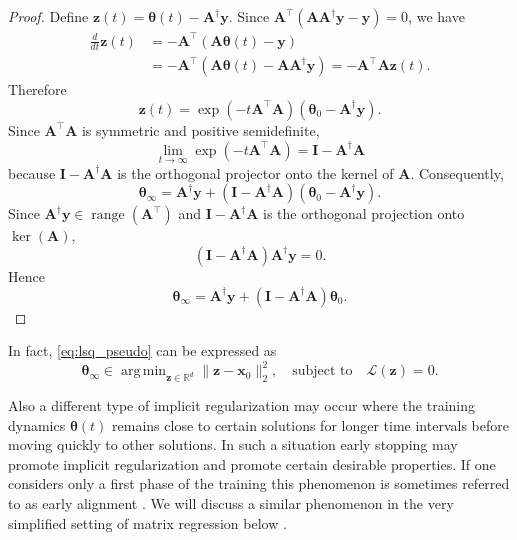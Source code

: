 \documentclass{svproc}
\newcommand{\bA}{\boldsymbol{A}}
\newcommand{\bI}{\boldsymbol{I}}
\newcommand{\bx}{\boldsymbol{x}}
\newcommand{\by}{\boldsymbol{y}}
\newcommand{\bz}{\boldsymbol{z}}
\newcommand{\btheta}{{\boldsymbol{\theta}}}
\newcommand{\0}{\boldsymbol{0}}
\newcommand{\1}{\boldsymbol{1}}
\DeclareMathOperator*{\argmin}{arg\,min}
\begin{document}
\begin{proof}
Define $\bz(t)=\btheta(t)-\bA^\dagger\by$. Since $\bA^\top(\bA\bA^\dagger\by-\by)=0$, we have
\begin{align*}
    \frac{d}{dt}{\bz}(t)
    &=-\bA^\top(\bA\btheta(t)-\by)\\
    &=-\bA^\top(\bA\btheta(t)-\bA\bA^\dagger\by)
    =-\bA^\top\bA\bz(t).
\end{align*}
Therefore
\begin{equation*}
    \bz(t)=\exp(-t\bA^\top\bA)(\btheta_0-\bA^\dagger\by).
\end{equation*}
Since $\bA^\top\bA$ is symmetric and positive semidefinite,
\begin{equation*}
    \lim_{t\to\infty}\exp(-t\bA^\top\bA)=\bI-\bA^\dagger\bA
\end{equation*}
because $\bI-\bA^\dagger\bA$ is the orthogonal projector onto the kernel of $\bA$. Consequently,
\begin{equation*}
    \btheta_\infty=\bA^\dagger\by+(\bI-\bA^\dagger\bA)(\btheta_0-\bA^\dagger\by).
\end{equation*}
Since $\bA^\dagger\by\in\operatorname{range}(\bA^\top)$ and $\bI-\bA^\dagger\bA$ is the orthogonal projection onto $\ker(\bA)$,
\begin{equation*}
    (\bI-\bA^\dagger\bA)\bA^\dagger\by=0.
\end{equation*}
Hence
\begin{equation*}
    \btheta_\infty=\bA^\dagger\by+(\bI-\bA^\dagger\bA)\btheta_0. \tag*{\qed}
\end{equation*}
\end{proof}
In fact, \eqref{eq:lsq_pseudo} can be expressed as
\begin{equation}\label{eq:implicit_bias_onelayer}
    \btheta_\infty \in \argmin_{\bz\in\mathbb{R}^d}\|\bz-\bx_0\|_2^2,\quad
    \text{subject to}\quad \mathcal{L}(\bz)= 0.
\end{equation}

\medskip

Also a different type of implicit regularization may occur where the training dynamics $\btheta(t)$ remains close to certain solutions for longer time intervals before moving quickly to other solutions. In such a situation early stopping may promote implicit regularization and promote certain desirable properties. If one considers only a first phase of the training this phenomenon is sometimes referred to as early alignment \cite{boursier2024}. We will discuss a similar phenomenon in the very simplified setting of matrix regression below \cite{chou2024gradient}.
\end{document}
